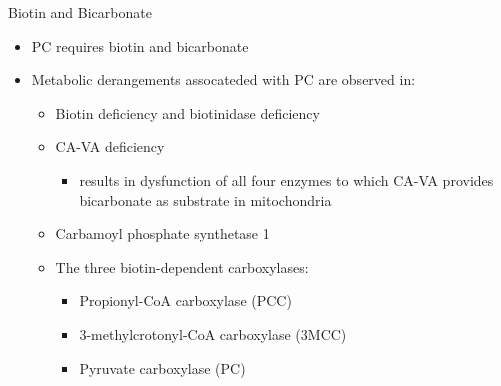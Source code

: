 \documentclass[presentation, smaller]{beamer}
\begin{document}
\begin{frame}[label={sec:org1d6111d}]{Biotin and Bicarbonate}
\begin{itemize}
\item PC requires biotin and bicarbonate
\item Metabolic derangements assocateded with PC are observed in:
\begin{itemize}
\item Biotin deficiency and biotinidase deficiency

\item CA-VA deficiency
\begin{itemize}
\item results in dysfunction of all four enzymes to which CA-VA
provides bicarbonate as substrate in mitochondria
\end{itemize}

\item Carbamoyl phosphate synthetase 1
\item The three biotin-dependent carboxylases:
\begin{itemize}
\item Propionyl-CoA carboxylase (PCC)
\item 3-methylcrotonyl-CoA carboxylase (3MCC)
\item Pyruvate carboxylase (PC)
\end{itemize}
\end{itemize}
\end{itemize}
\end{frame}
\end{document}
